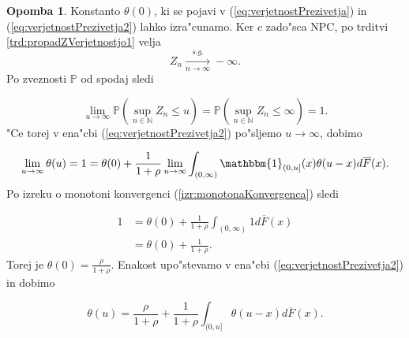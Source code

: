 \documentclass[12pt, a4paper, reqno]{amsart}
\theoremstyle{definition}
\newtheorem{opomba}[definicija]{Opomba}
\theoremstyle{plain}
\newcommand{\N}{\mathbb{N}}
\newcommand{\E}{\mathbb{E}}
\newcommand{\Prob}{\mathbb{P}}
\newcommand{\1}{\mathds{1}}
\begin{document}
            \begin{opomba}
                Konstanto $\theta(0)$, ki se pojavi v (\ref{eq:verjetnostPrezivetja}) in 
                (\ref{eq:verjetnostPrezivetja2}) lahko izra"cunamo. Ker $c$ zado"sca NPC, po trditvi 
                \ref{trd:propadZVerjetnostjo1} velja 
                \begin{equation*}
                    Z_n \xrightarrow[n\to\infty]{s.g.} -\infty.
                \end{equation*}
                Po zveznosti $\Prob$ od spodaj sledi

                \begin{equation*}
                    \lim_{u\to\infty}\Prob\left(\sup_{n\in\N}Z_n \leq u\right) = \Prob\left(\sup_{n\in\N}Z_n \leq \infty\right) = 1.
                \end{equation*}
                "Ce torej v ena"cbi (\ref{eq:verjetnostPrezivetja2}) po"sljemo $u\to\infty$, dobimo

                \begin{equation*}
                    \lim_{u\to\infty}\theta(u) = 1 = \theta(0) + \frac{1}{1 + \rho}\lim_{u\to\infty}\int_{(0, \infty)}\mathbbm{1}_{(0, u]}(x)\theta(u - x)d\overline{F}(x). \\
                \end{equation*}
                Po izreku o monotoni konvergenci (\ref{izr:monotonaKonvergenca}) sledi

                \begin{align*}
                    1 &= \theta(0) + \frac{1}{1 + \rho}\int_{(0, \infty)}1d\overline{F}(x) \\
                     &= \theta(0) + \frac{1}{1 + \rho}.
                \end{align*}
                Torej je $\theta(0) = \frac{\rho}{1 + \rho}$.
                Enakost upo"stevamo v ena"cbi (\ref{eq:verjetnostPrezivetja2}) in dobimo

                \begin{equation}
                    \theta(u) = \frac{\rho}{1 + \rho} + \frac{1}{1 + \rho}\int_{(0, u]}\theta(u - x)d\overline{F}(x).
                    \label{eq:verjetnostPrezivetja3}
                \end{equation}

                \label{op:verjetnostPrezivetja2}
            \end{opomba}
\end{document}

